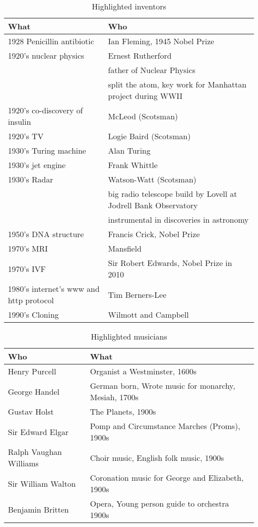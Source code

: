 \documentclass{amsart}
\begin{document}
\begin{table}[h!]
	 \begin{center}
	 	\small
		\begin{tabular}{|l|l|}
		\hline
		What & Who\\
		\hline
		\hline
		 1928 Penicillin antibiotic & Ian Fleming, 1945 Nobel Prize\\
		\hline
		 1920's nuclear physics &  Ernest Rutherford\\
		 & father of Nuclear Physics\\
		 & split the atom, key work for Manhattan project during WWII\\
		\hline
		 1920's co-discovery of insulin &  McLeod (Scotsman)\\
		\hline
		 1920's TV &  Logie Baird (Scotsman)\\
		\hline
		 1930's Turing machine &  Alan Turing\\
		\hline
		 1930's jet engine & Frank Whittle\\
		\hline
		 1930's Radar &  Watson-Watt (Scotsman)\\
		 &big radio telescope build by Lovell at Jodrell Bank Observatory\\
		 &instrumental in discoveries in astronomy\\
		\hline
		 1950's DNA structure &  Francis Crick,  Nobel Prize\\
		\hline
		 1970's MRI & Mansfield		\\
		 \hline 
		 1970's IVF & Sir Robert Edwards, Nobel Prize in 2010\\
		\hline
		 1980's internet's www and http protocol & Tim Berners-Lee\\
		\hline
		 1990's Cloning & Wilmott and Campbell\\
		\hline
		\end{tabular}
		\caption{Highlighted inventors}\label{tab:inventors}
  	\end{center}
\end{table}


\begin{table}[h!tb]
	 \begin{center}
		\begin{tabular}{|l|l|}
		\hline
		Who & What\\
		\hline
		\hline
		 Henry Purcell &  Organist a Westminster, 1600s\\
		 \hline
	 George Handel& German born, Wrote music for monarchy, Mesiah, 1700s\\
		 \hline
	  Gustav Holst& The Planets, 1900s\\
		 \hline
	 Sir Edward Elgar& Pomp and Circumstance Marches (Proms), 1900s\\
		 \hline
	 Ralph Vaughan Williams& Choir music, English folk music, 1900s\\
		 \hline
	 Sir William Walton& Coronation music for George and Elizabeth, 1900s\\
		 \hline
	 Benjamin Britten & Opera, Young person guide to orchestra 1900s\\
	 \hline
		\end{tabular}
		\caption{Highlighted musicians}\label{tab:musicians}
  	\end{center}
\end{table}
\end{document}

